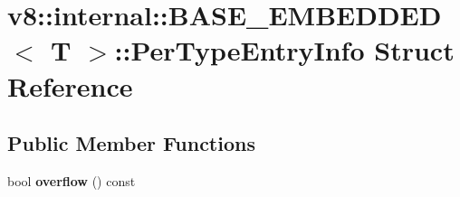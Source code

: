 \hypertarget{structv8_1_1internal_1_1_b_a_s_e___e_m_b_e_d_d_e_d_1_1_per_type_entry_info}{}\section{v8\+:\+:internal\+:\+:B\+A\+S\+E\+\_\+\+E\+M\+B\+E\+D\+D\+ED$<$ T $>$\+:\+:Per\+Type\+Entry\+Info Struct Reference}
\label{structv8_1_1internal_1_1_b_a_s_e___e_m_b_e_d_d_e_d_1_1_per_type_entry_info}
\subsection*{Public Member Functions}
\begin{DoxyCompactItemize}
\item 
bool {\bfseries overflow} () const \hypertarget{structv8_1_1internal_1_1_b_a_s_e___e_m_b_e_d_d_e_d_1_1_per_type_entry_info_a4ea2039b0c56880589e76ac7a430656f}{}\label{structv8_1_1internal_1_1_b_a_s_e___e_m_b_e_d_d_e_d_1_1_per_type_entry_info_a4ea2039b0c56880589e76ac7a430656f}

\end{DoxyCompactItemize}
